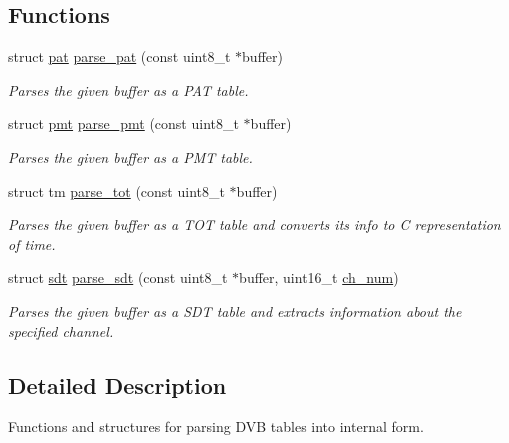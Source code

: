 \subsection*{Functions}
\begin{DoxyCompactItemize}
\item 
struct \hyperlink{structpat}{pat} \hyperlink{group__parsing_ga15422ae30e0e1e43a15691ec066fb50f}{parse\+\_\+pat} (const uint8\+\_\+t $\ast$buffer)\hypertarget{group__parsing_ga15422ae30e0e1e43a15691ec066fb50f}{}\label{group__parsing_ga15422ae30e0e1e43a15691ec066fb50f}

\begin{DoxyCompactList}\small\item\em Parses the given buffer as a P\+AT table. \end{DoxyCompactList}\item 
struct \hyperlink{structpmt}{pmt} \hyperlink{group__parsing_ga1b750ab710b8dd637d53f464889bc179}{parse\+\_\+pmt} (const uint8\+\_\+t $\ast$buffer)\hypertarget{group__parsing_ga1b750ab710b8dd637d53f464889bc179}{}\label{group__parsing_ga1b750ab710b8dd637d53f464889bc179}

\begin{DoxyCompactList}\small\item\em Parses the given buffer as a P\+MT table. \end{DoxyCompactList}\item 
struct tm \hyperlink{group__parsing_gaf17c5270835b375f54f4752583f65287}{parse\+\_\+tot} (const uint8\+\_\+t $\ast$buffer)\hypertarget{group__parsing_gaf17c5270835b375f54f4752583f65287}{}\label{group__parsing_gaf17c5270835b375f54f4752583f65287}

\begin{DoxyCompactList}\small\item\em Parses the given buffer as a T\+OT table and converts its info to C representation of time. \end{DoxyCompactList}\item 
struct \hyperlink{structsdt}{sdt} \hyperlink{group__parsing_ga675aeacd9c1963445cce9f2e78b6b2a1}{parse\+\_\+sdt} (const uint8\+\_\+t $\ast$buffer, uint16\+\_\+t \hyperlink{structures_8h_abcdde739cb26f5c6c2c0b87e83d1f421}{ch\+\_\+num})\hypertarget{group__parsing_ga675aeacd9c1963445cce9f2e78b6b2a1}{}\label{group__parsing_ga675aeacd9c1963445cce9f2e78b6b2a1}

\begin{DoxyCompactList}\small\item\em Parses the given buffer as a S\+DT table and extracts information about the specified channel. \end{DoxyCompactList}\end{DoxyCompactItemize}


\subsection{Detailed Description}
Functions and structures for parsing D\+VB tables into internal form. 

